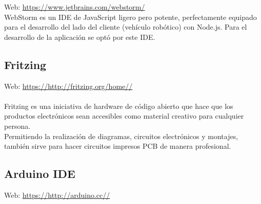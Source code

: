 Web: \url{https://www.jetbrains.com/webstorm/}\\

WebStorm es un IDE de JavaScript ligero pero potente, perfectamente equipado para el desarrollo del lado del cliente (vehículo robótico) con Node.js. Para el desarrollo de la aplicación se optó por este IDE. \\

\subsection{Fritzing}


Web: \url{https://http://fritzing.org/home//} \cite{website:1} \\

\\Fritzing es una iniciativa de hardware de código abierto que hace que los productos electrónicos sean accesibles como material creativo para cualquier persona.\\

Permitiendo la realización de diagramas, circuitos electrónicos y montajes, también sirve para hacer circuitos impresos PCB de manera profesional.

\subsection{Arduino IDE}


Web: \url{https://http://arduino.cc//} \cite{website:1} \\

